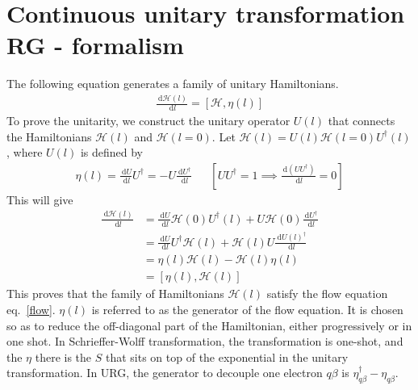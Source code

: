 \documentclass[twoside,11pt]{report}
\numberwithin{equation}{section}
\begin{document}
\section{Continuous unitary transformation RG - formalism}
The following equation generates a family of unitary Hamiltonians.
\begin{equation}\begin{aligned}
	\label{flow}
	\frac{\:\mathrm{d}\mathcal{H}(l)}{\:\mathrm{d}l} = \left[\mathcal{H},\eta(l)\right]
\end{aligned}\end{equation}
To prove the unitarity\cite{kehrein}, we construct the unitary operator \(U(l)\) that connects the Hamiltonians \(\mathcal{H}(l)\) and \(\mathcal{H}(l=0)\). Let \(\mathcal{H}(l) = U(l)\mathcal{H}(l=0)U^\dagger(l)\), where \(U(l)\) is defined by
\begin{equation}\begin{aligned}
	\eta(l) = \frac{\:\mathrm{d}U}{\:\mathrm{d}l}U^\dagger = -U\frac{\:\mathrm{d}U^\dagger}{\:\mathrm{d}l} &&\left[UU^\dagger = 1 \implies \frac{\:\mathrm{d}\left(U U^\dagger\right)}{\:\mathrm{d}l}=0\right]
\end{aligned}\end{equation}
This will give
\begin{equation}\begin{aligned}
	\frac{\:\mathrm{d}\mathcal{H}(l)}{\:\mathrm{d}l} &= \frac{\:\mathrm{d}U}{\:\mathrm{d}l}\mathcal{H}(0)U^\dagger(l) + U\mathcal{H}(0)\frac{\:\mathrm{d}U^\dagger}{\:\mathrm{d}l}\\
							 &= \frac{\:\mathrm{d}U}{\:\mathrm{d}l}U^\dagger\mathcal{H}(l) + \mathcal{H}(l)U\frac{\:\mathrm{d}U(l)^\dagger}{\:\mathrm{d}l}\\
        &= \eta(l)\mathcal{H}(l) - \mathcal{H}(l)\eta(l)\\
	&=\left[\eta(l),\mathcal{H}(l)\right]
\end{aligned}\end{equation}
This proves that the family of Hamiltonians \(\mathcal{H}(l)\) satisfy the flow equation eq.~\ref{flow}. \(\eta(l)\) is referred to as the generator of the flow equation. It is chosen so as to reduce the off-diagonal part of the Hamiltonian, either progressively or in one shot. In Schrieffer-Wolff transformation, the transformation is one-shot, and the \(\eta\) there is the \(S\) that sits on top of the exponential in the unitary transformation. In URG, the generator to decouple one electron \(q\beta\) is \(\eta^\dagger_{q\beta} - \eta_{q\beta}\).
\end{document}
